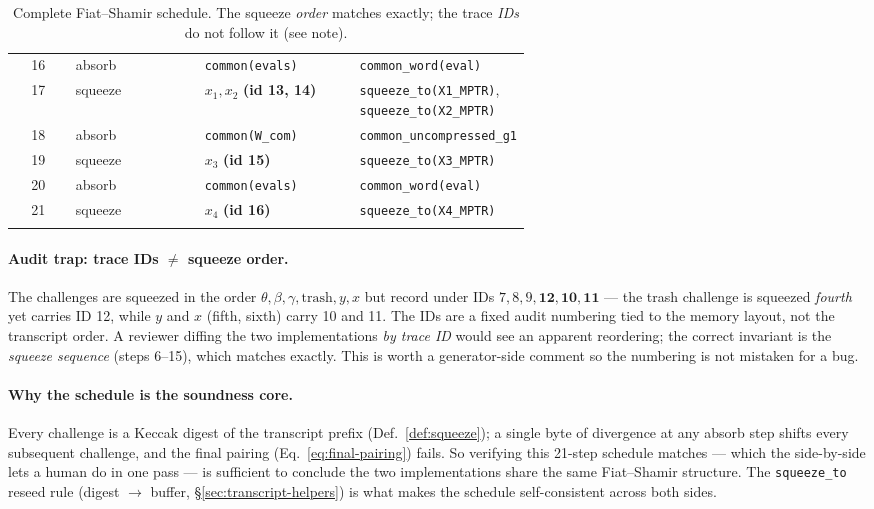 \begin{small}
\begin{longtable}{@{}clp{0.30\linewidth}p{0.30\linewidth}@{}}
16 & absorb & \texttt{common(evals)} & \texttt{common\_\allowbreak{}word(eval)} \\
17 & squeeze & $x_1, x_2$ \textbf{(id 13, 14)} & \texttt{squeeze\_\allowbreak{}to(X1\_\allowbreak{}MPTR)}, \texttt{squeeze\_\allowbreak{}to(X2\_\allowbreak{}MPTR)} \\
18 & absorb & \texttt{common(W\_com)} & \texttt{common\_\allowbreak{}uncompressed\_\allowbreak{}g1} \\
19 & squeeze & $x_3$ \textbf{(id 15)} & \texttt{squeeze\_\allowbreak{}to(X3\_\allowbreak{}MPTR)} \\
20 & absorb & \texttt{common(evals)} & \texttt{common\_\allowbreak{}word(eval)} \\
21 & squeeze & $x_4$ \textbf{(id 16)} & \texttt{squeeze\_\allowbreak{}to(X4\_\allowbreak{}MPTR)} \\
\bottomrule
\caption{Complete Fiat--Shamir schedule. The squeeze \emph{order}
matches exactly; the trace \emph{IDs} do not follow it (see note).}
\label{tab:fs-schedule}
\end{longtable}
\end{small}

\paragraph{Audit trap: trace IDs $\neq$ squeeze order.} The challenges
are squeezed in the order $\theta,\beta,\gamma,\text{trash},y,x$ but
record under IDs $7,8,9,\mathbf{12},\mathbf{10},\mathbf{11}$ --- the
trash challenge is squeezed \emph{fourth} yet carries ID 12, while $y$
and $x$ (fifth, sixth) carry 10 and 11. The IDs are a fixed audit
numbering tied to the memory layout, not the transcript order. A
reviewer diffing the two implementations \emph{by trace ID} would see
an apparent reordering; the correct invariant is the \emph{squeeze
sequence} (steps 6--15), which matches exactly. This is worth a
generator-side comment so the numbering is not mistaken for a bug.

\paragraph{Why the schedule is the soundness core.} Every challenge is
a Keccak digest of the transcript prefix (Def.~\ref{def:squeeze}); a
single byte of divergence at any absorb step shifts every subsequent
challenge, and the final pairing (Eq.~\eqref{eq:final-pairing}) fails.
So verifying this 21-step schedule matches --- which the side-by-side
lets a human do in one pass --- is sufficient to conclude the two
implementations share the same Fiat--Shamir structure. The
\texttt{squeeze\_to} reseed rule (digest $\to$ buffer,
\S\ref{sec:transcript-helpers}) is what makes the schedule
self-consistent across both sides.

